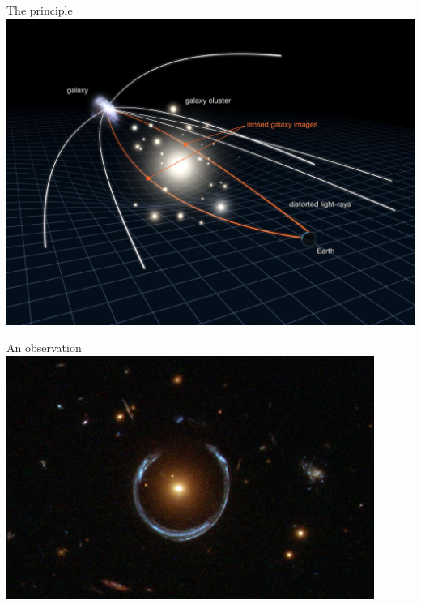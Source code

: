 \Tr
{}%
\begin{center}
The principle\\[3mm]
\includegraphics[keepaspectratio,width=14cm]{grav-lens}
\end{center}

\newpage
%
\begin{center}
An observation\\[3mm]
\includegraphics[keepaspectratio,width=12cm]{grav-ring}
\end{center}

